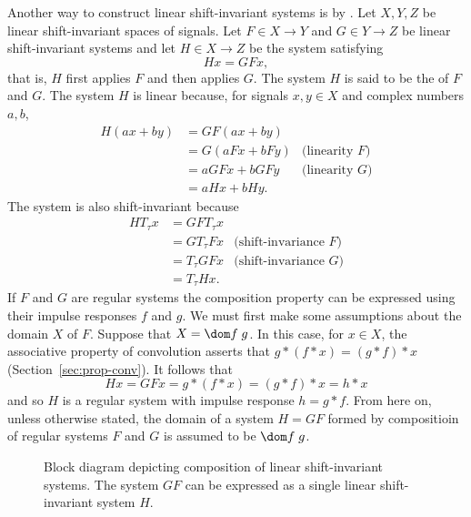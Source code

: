 Another way to construct linear shift-invariant systems is by .  Let $X, Y, Z$ be linear shift-invariant spaces of signals.  Let $F \in X \to Y$ and $G \in Y \to Z$ be linear shift-invariant systems and let $H \in X \to Z$ be the system satisfying
\[
H x = G F x,
\]
that is, $H$ first applies $F$ and then applies $G$.  The system $H$ is said to be the  of $F$ and $G$.  The system $H$ is linear because, for signals $x,y \in X$ and complex numbers $a,b$,
\begin{align*}
H(ax + by) &= G F(ax + by) \\
&= G(aF x + bF y )  &\text{(linearity $F$)}\\
&= aG F x + bG F y  &\text{(linearity $G$)} \\
&= aHx + bHy.
\end{align*}
The system is also shift-invariant because
\begin{align*}
H T_\tau x &= GF T_\tau x \\
&= G T_\tau F x  &\text{(shift-invariance $F$)}\\
&= T_\tau G F x  &\text{(shift-invariance $G$)} \\
&= T_\tau H x .
\end{align*}
If $F$ and $G$ are regular systems the composition property can be expressed using their impulse responses $f$ and $g$.  We must first make some assumptions about the domain $X$ of $F$.  Suppose that $X = \dom f\;g$.  In this case, for $x \in X$, the associative property of convolution asserts that $g * (f * x) = (g* f) * x$ (Section~\ref{sec:prop-conv}).  It follows that 
\[
Hx = GF x = g * (f * x) = (g* f) * x = h * x
\]
and so $H$ is a regular system with impulse response $h = g * f$.  From here on, unless otherwise stated, the domain of a system $H = GF$ formed by compositioin of regular systems $F$ and $G$ is assumed to be $\dom f\;g$.  %

\begin{figure}
\centering
{}
\caption{Block diagram depicting composition of linear shift-invariant systems. The system $GF$ can be expressed as a single linear shift-invariant system $H$.}\label{blockdiag:compositionlti}
\end{figure}

